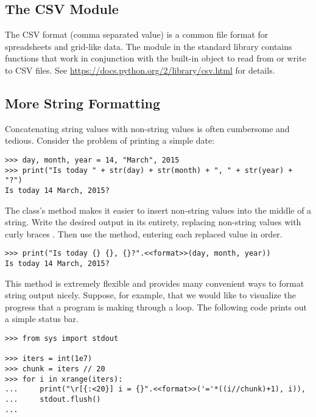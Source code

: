 \subsection*{The CSV Module} %

The CSV format (comma separated value) is a common file format for spreadsheets and grid-like data.
The  module in the standard library contains functions that work in conjunction with the built-in  object to read from or write to CSV files.
See \url{https://docs.python.org/2/library/csv.html} for details.

\newpage

\subsection*{More String Formatting} %

Concatenating string values with non-string values is often cumbersome and tedious.
Consider the problem of printing a simple date:

\begin{lstlisting}
>>> day, month, year = 14, "March", 2015
>>> print("Is today " + str(day) + str(month) + ", " + str(year) + "?")
Is today 14 March, 2015?
\end{lstlisting}

The  class's  method makes it easier to insert non-string values into the middle of a string.
Write the desired output in its entirety, replacing non-string values with curly braces \li{\{\}}.
Then use the  method, entering each replaced value in order.

\begin{lstlisting}
>>> print("Is today {} {}, {}?".<<format>>(day, month, year))
Is today 14 March, 2015?
\end{lstlisting}

This method is extremely flexible and provides many convenient ways to format string output nicely.
Suppose, for example, that we would like to visualize the progress that a program is making through a loop.
The following code prints out a simple status bar.

\begin{lstlisting}
>>> from sys import stdout

>>> iters = int(1e7)
>>> chunk = iters // 20
>>> for i in xrange(iters):
...     print("\r[{:<20}] i = {}".<<format>>('='*((i//chunk)+1), i)),
...     stdout.flush()
...
\end{lstlisting}


